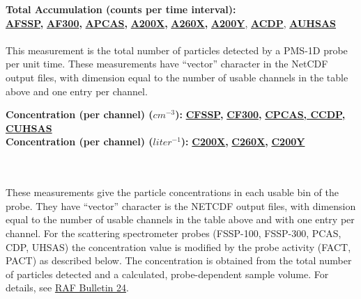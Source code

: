 \begin{hangparagraphs}
\textbf{Total Accumulation (counts per time interval): }\textbf{\uline{}}\\
\textbf{\uline{AFSSP}}\textbf{,
}\textbf{\uline{AF300}}\textbf{,
}\textbf{\uline{APCAS}}\textbf{,
}\textbf{\uline{A200X}}\textbf{,
}\textbf{\uline{A260X}}\textbf{,
}\textbf{\uline{A200Y}}, \textbf{\uline{ACDP}},
\textbf{\uline{AUHSAS}}\\
\\
This measurement is the total number of particles detected by a PMS-1D
probe per unit time. These measurements have ``vector'' character
in the NetCDF output files, with dimension equal to
the number of usable channels in the table above and one entry per
channel. 

\textbf{}%
\begin{minipage}[t]{1\columnwidth}%
\textbf{Concentration (per channel) ($cm^{-3}$): }\textbf{\uline{CFSSP}}\textbf{,
}\textbf{\uline{CF300}}\textbf{, }\textbf{\uline{CPCAS,
CCDP, CUHSAS}}\\
\textbf{Concentration (per channel) ($liter^{-1}$): }\textbf{\uline{C200X}}\textbf{,
}\textbf{\uline{C260X}}\textbf{, }\textbf{\uline{C200Y}}%
\end{minipage}\textbf{}\\
\textbf{}\\
These measurements give the particle concentrations
in each usable bin of the probe. They have ``vector'' character
is the NETCDF output files, with dimension equal to the number of
usable channels in the table above and with one entry per channel.
For the scattering spectrometer
probes (FSSP-100, FSSP-300, PCAS, CDP,
UHSAS) the concentration value is modified by the probe
activity (FACT, PACT) as described below.
The concentration is obtained from the total number of particles detected
and a calculated, probe-dependent sample volume. For details, see
\href{http://www.eol.ucar.edu/raf/Bulletins/bulletin24.html}{RAF Bulletin 24}.


\end{hangparagraphs}
